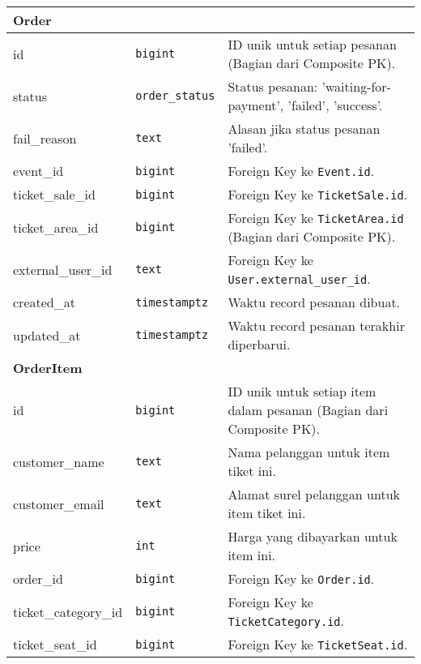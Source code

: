 \begin{longtable}{|l|p{}|p{}|}
	\hline
	\multicolumn{3}{|l|}{\textbf{Order}} \\
	\hline
	id 					& \texttt{bigint} 		& ID unik untuk setiap pesanan (Bagian dari Composite PK). 																				\\
	\hline
	status 				& \texttt{order\_status} & Status pesanan: 'waiting-for-payment', 'failed', 'success'. 																			\\
	\hline
	fail\_reason 		& \texttt{text} 			& Alasan jika status pesanan 'failed'. 																												\\
	\hline
	event\_id 			& \texttt{bigint} 		& Foreign Key ke \texttt{Event.id}. 																													\\
	\hline
	ticket\_sale\_id 	& \texttt{bigint} 		& Foreign Key ke \texttt{TicketSale.id}. 																											\\
	\hline
	ticket\_area\_id 	& \texttt{bigint} 		& Foreign Key ke \texttt{TicketArea.id} (Bagian dari Composite PK). 																		\\
	\hline
	external\_user\_id 	& \texttt{text} 			& Foreign Key ke \texttt{User.external\_user\_id}. 																									\\
	\hline
	created\_at 		& \texttt{timestamptz} 	& Waktu record pesanan dibuat. 																														\\
	\hline
	updated\_at 		& \texttt{timestamptz} 	& Waktu record pesanan terakhir diperbarui. 																										\\
	\hline
	\multicolumn{3}{|l|}{\textbf{OrderItem}} \\
	\hline
	id 					& \texttt{bigint} 		& ID unik untuk setiap item dalam pesanan (Bagian dari Composite PK). 																		\\
	\hline
	customer\_name 		& \texttt{text} 			& Nama pelanggan untuk item tiket ini. 																												\\
	\hline
	customer\_email 	& \texttt{text} 			& Alamat surel pelanggan untuk item tiket ini. 																										\\
	\hline
	price 				& \texttt{int} 			& Harga yang dibayarkan untuk item ini. 																												\\
	\hline
	order\_id 			& \texttt{bigint} 		& Foreign Key ke \texttt{Order.id}. 																													\\
	\hline
	ticket\_category\_id & \texttt{bigint} 		& Foreign Key ke \texttt{TicketCategory.id}. 																										\\
	\hline
	ticket\_seat\_id 	& \texttt{bigint} 		& Foreign Key ke \texttt{TicketSeat.id}. 																											\\

\end{longtable}
